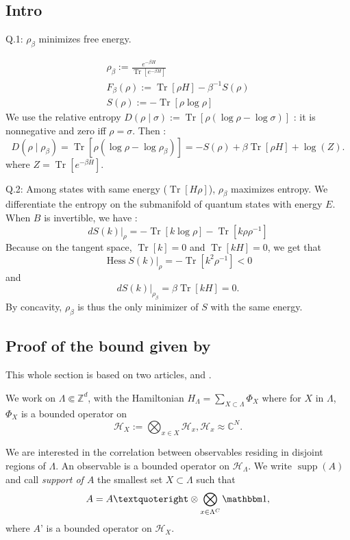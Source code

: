 \documentclass[french]{article}
\DeclareMathOperator{\Tr}{Tr}
\DeclareMathOperator{\Hess}{Hess}
\DeclareMathOperator{\supp}{supp}
\begin{document}
\subsection{Intro}
Q.1: $\rho_\beta$ minimizes free energy.

\begin{eqnarray*}
   \rho_\beta:= \frac{e^{-\beta H}}{\Tr[e^{-\beta H}]}\\
F_\beta(\rho):=\Tr[\rho H]-\beta^{-1}S(\rho)\\
S(\rho):=-\Tr[\rho\log\rho]
\end{eqnarray*}
 We use the relative entropy $D(\rho\mid \sigma):=\Tr[\rho(\log \rho - \log  \sigma)]$ : it is nonnegative and zero iff $\rho=\sigma$.
 Then :
 $$
 D(\rho\mid\rho_\beta)=\Tr[\rho(\log\rho-\log\rho_\beta)]=-S(\rho)+\beta\Tr[\rho H]+\log(Z).
 $$
 where $Z=\Tr[e^{-\beta H}]$.
 
 Q.2: Among states with same energy ($\Tr[H\rho]$), $\rho_\beta$ maximizes entropy.
 We differentiate the entropy on the submanifold of quantum states with energy $E$.
 When $B$ is invertible, we have : $$
 dS(k)\vert_{\rho}=-\Tr[k\log \rho]-\Tr[k\rho\rho^{-1}]
 $$
 Because on the tangent space, $\Tr[k]=0$ and $\Tr[kH]=0$, we get that $$
 \Hess S(k)\vert_{\rho}=-\Tr[k^2\rho^{-1}]<0
 $$
 and $$
 dS(k)\vert_{\rho_\beta}=\beta\Tr[kH]=0.
 $$
 By concavity, $\rho_\beta$ is thus the only minimizer of $S$ with the same energy.
 
 \subsection{Proof of the bound given by \cite{froehlichPropertiesCorrelationsQuantum2015}}
 
 This whole section is based on two articles, \cite{froehlichPropertiesCorrelationsQuantum2015} and \cite{ueltschiClusterExpansionsCorrelation2005}.
 
 We work on $\Lambda\Subset \mathbb{Z}^d$, with the Hamiltonian $H_\Lambda=\sum_{X\subset \Lambda} \Phi_X$ where for $X$ in $\Lambda$, $\Phi_X$ is a bounded operator on $$\mathcal H_X:=\bigotimes_{x\in X}\mathcal H_x, \mathcal{H}_x\approx\mathbb C^N.$$
 
 We are interested in the correlation between observables residing in disjoint regions of $\Lambda$.
 An observable is a bounded operator on $\mathcal H_\Lambda$.
 We write $\supp(A)$ and call {\it support of $A$} the smallest set $X\subset \Lambda$ such that $$A=A’\otimes\bigotimes_{x\in \Lambda^C}\mathbbm 1,$$ where $A’$ is a bounded operator on $\mathcal H_X$.
 
\end{document}
